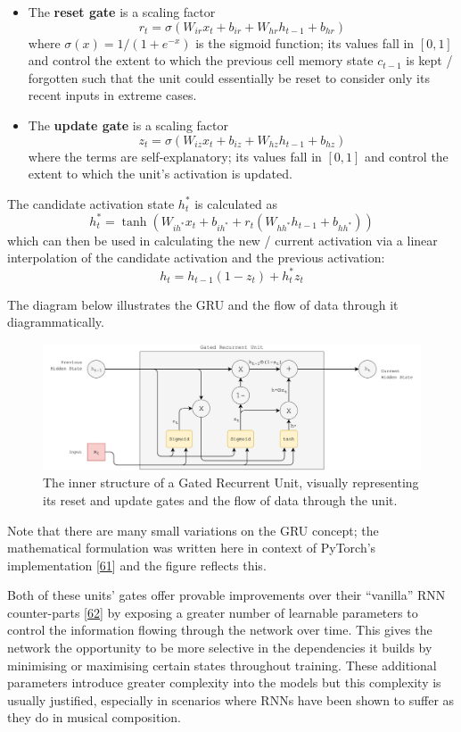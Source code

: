 \documentclass[12pt,]{article}
\providecommand{\tightlist}{%
  \setlength{\itemsep}{0pt}\setlength{\parskip}{0pt}}
\begin{document}
\begin{itemize}
\tightlist
\item
  The \textbf{reset gate} is a scaling factor
  \[r_t = \sigma(W_{ir} x_t + b_{ir} + W_{hr} h_{t-1} + b_{hr})\] where
  \(\sigma(x) = 1 / (1 + e^{-x})\) is the sigmoid function; its values
  fall in \([0,1]\) and control the extent to which the previous cell
  memory state \(c_{t-1}\) is kept / forgotten such that the unit could
  essentially be reset to consider only its recent inputs in extreme
  cases.
\item
  The \textbf{update gate} is a scaling factor
  \[z_t = \sigma(W_{iz} x_t + b_{iz} + W_{hz} h_{t-1} + b_{hz})\] where
  the terms are self-explanatory; its values fall in \([0,1]\) and
  control the extent to which the unit's activation is updated.
\end{itemize}

The candidate activation state \(h_t^*\) is calculated as
\[h_t^* = \tanh(W_{ih^*} x_t + b_{ih^*} + r_t (W_{hh^*} h_{t-1} + b_{hh^*}))\]
which can then be used in calculating the new / current activation via a
linear interpolation of the candidate activation and the previous
activation: \[h_t = h_{t-1} (1 - z_t) + h_t^* z_t\]

The diagram below illustrates the GRU and the flow of data through it
diagrammatically.

\begin{figure}
\centering
\includegraphics{Images/gru.png}
\caption{The inner structure of a Gated Recurrent Unit, visually
representing its reset and update gates and the flow of data through the
unit.}
\end{figure}

Note that there are many small variations on the GRU concept; the
mathematical formulation was written here in context of PyTorch's
implementation {[}\protect\hyperlink{ref-pytorchgru}{61}{]} and the
figure reflects this.

Both of these units' gates offer provable improvements over their
``vanilla'' RNN counter-parts
{[}\protect\hyperlink{ref-chung2014empirical}{62}{]} by exposing a
greater number of learnable parameters to control the information
flowing through the network over time. This gives the network the
opportunity to be more selective in the dependencies it builds by
minimising or maximising certain states throughout training. These
additional parameters introduce greater complexity into the models but
this complexity is usually justified, especially in scenarios where RNNs
have been shown to suffer as they do in musical composition.
\end{document}
